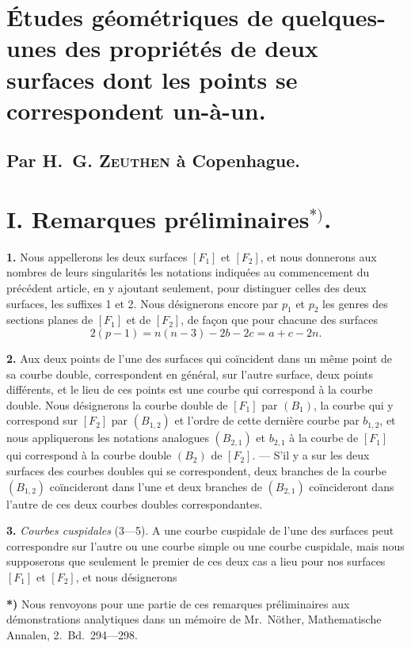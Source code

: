 \documentclass{article}
\begin{document}
\section*{Études géométriques de quelques-unes des propriétés de deux surfaces dont les points se correspondent un-à-un.}

\subsection*{Par H.~G. \textsc{Zeuthen} à Copenhague.}

\section*{I. Remarques préliminaires${}^{*)}$.}

\textbf{1.} Nous appellerons les deux surfaces $[F_1]$ et $[F_2]$, et nous donnerons aux nombres de leurs singularités les notations indiquées au commencement du précédent article, en y ajoutant seulement, pour distinguer celles des deux surfaces, les suffixes 1 et 2. Nous désignerons encore par $p_1$ et $p_2$ les genres des sections planes de $[F_1]$ et de $[F_2]$, de façon que pour chacune des surfaces
\[
2(p - 1) = n(n - 3) - 2b - 2c = a + c - 2n. \tag{1}
\]

\textbf{2.} Aux deux points de l'une des surfaces qui coïncident dans un même point de sa courbe double, correspondent en général, sur l'autre surface, deux points différents, et le lieu de ces points est une courbe qui correspond à la courbe double. Nous désignerons la courbe double de $[F_1]$ par $(B_1)$, la courbe qui y correspond sur $[F_2]$ par $(B_{1, 2})$ et l'ordre de cette dernière courbe par $b_{1, 2}$, et nous appliquerons les notations analogues $(B_{2, 1})$ et $b_{2, 1}$ à la courbe de $[F_1]$ qui correspond à la courbe double $(B_2)$ de $[F_2]$. --- S'il y a sur les deux surfaces des courbes doubles qui se correspondent, deux branches de la courbe $(B_{1, 2})$ coïncideront dans l'une et deux branches de $(B_{2, 1})$ coïncideront dans l'autre de ces deux courbes doubles correspondantes.

\textbf{3.} \emph{Courbes cuspidales} (3---5). A une courbe cuspidale de l'une des surfaces peut correspondre sur l'autre ou une courbe simple ou une courbe cuspidale, mais nous supposerons que seulement le premier de ces deux cas a lieu pour nos surfaces $[F_1]$ et $[F_2]$, et nous désignerons

\textbf{*)} Nous renvoyons pour une partie de ces remarques préliminaires aux démonstrations analytiques dans un mémoire de Mr.~Nöther, Mathematische Annalen, 2.~Bd.\ 294---298.
\end{document}
